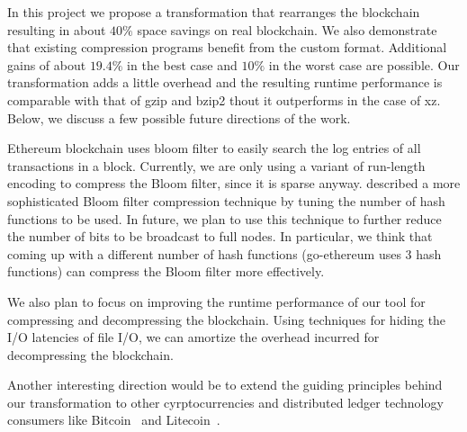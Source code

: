 In this project we propose a transformation that rearranges the \eth{} blockchain resulting in about $40\%$ space savings on real blockchain.
We also demonstrate that existing compression programs benefit from the custom format. Additional gains of about $19.4\%$ in the best case and $10\%$ in the worst case are possible.
Our transformation adds a little overhead and 
the resulting runtime performance is comparable with that of gzip and bzip2 thout it outperforms in the case of xz. 
Below, we discuss a few possible future directions of the work.

Ethereum blockchain uses bloom filter to easily search the log entries of all transactions in a block.
Currently, we are only using a variant of run-length encoding to compress the Bloom filter, since it is sparse anyway. 
\citet{mitzenmacher:2001} described a more sophisticated Bloom filter compression technique by tuning the number of hash functions to be used. 
In future, we plan to use this technique to further reduce the number of bits to be broadcast to full nodes.
In particular, we think that coming up with a different number of hash functions (go-ethereum uses 3 hash functions) can compress the Bloom filter more effectively.

We also plan to focus on improving the runtime performance of our tool for compressing and decompressing the blockchain.
Using techniques for hiding the I/O latencies of file I/O, we can amortize 
the overhead incurred for decompressing the blockchain.

Another interesting direction would be to extend the guiding principles behind our transformation to other cyrptocurrencies and distributed ledger technology consumers like Bitcoin~\cite{bitcoin} and Litecoin~\cite{litecoin}.

